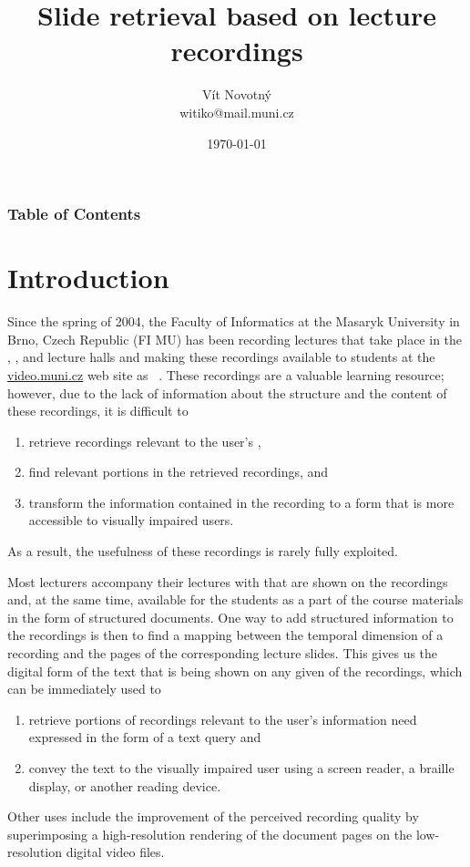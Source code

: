\title[Lecture slide retrieval]{Slide retrieval based on lecture recordings}
\author[V.\,Novotný]{Vít Novotný \\ witiko@mail.muni.cz}
\date{\today}
\subject{Project report}

\maketitle

\begin{frame}
\frametitle<presentation>{Table of Contents}
\tableofcontents
\end{frame}

\section{Introduction}
Since the spring of 2004, the Faculty of Informatics at the Masaryk University
in Brno, Czech Republic (FI MU) has been recording lectures that take place in
the , , and  lecture halls and making these
recordings available to students at the
\href{https://www.video.muni.cz}{video.muni.cz} web site as ~\cite{hladkaliska03lectures}. These recordings are a valuable learning
resource; however, due to the lack of information about the structure and the
content of these recordings, it is difficult to
\begin{enumerate}
\item retrieve recordings relevant to the user's ,
\item find relevant portions in the retrieved recordings, and
\item transform the information contained in the recording to a form that is more
  accessible to visually impaired users.
\end{enumerate}
As a result, the usefulness of these recordings is rarely fully exploited.

Most lecturers accompany their lectures with  that are shown
on the recordings and, at the same time, available for the students as a part of
the course materials in the form of structured  documents. One way to
add structured information to the recordings is then to find a mapping between the
temporal dimension of a recording and the pages of the corresponding lecture
slides. This gives us the digital form of the text that is being shown on any
given  of the recordings, which can be immediately used to
\begin{enumerate}
\item retrieve portions of recordings relevant to the user's information need
  expressed in the form of a text query and
\item convey the text to the visually impaired user using a screen reader, a
  braille display, or another reading device.
\end{enumerate}
Other uses include the improvement of the perceived recording quality by
superimposing a high-resolution rendering of the  document pages on
the low-resolution digital video files.

